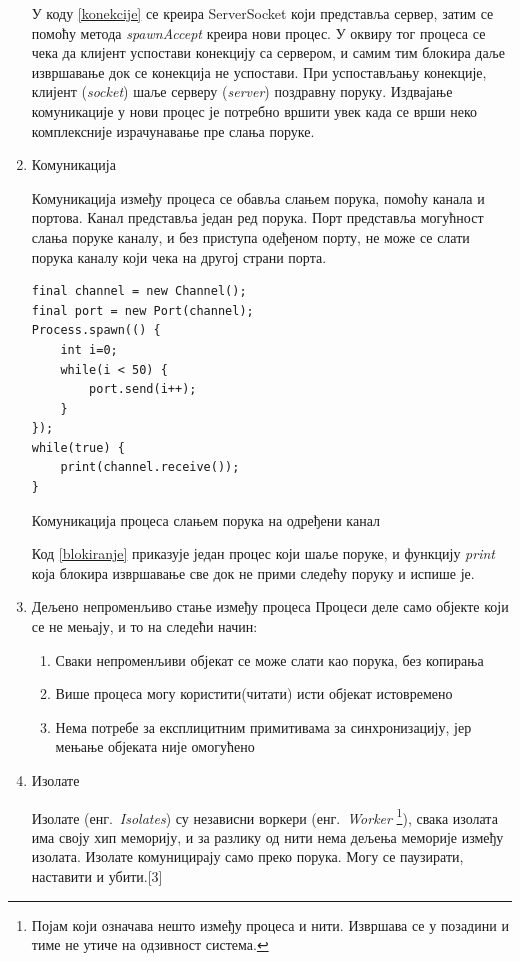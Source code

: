 \documentclass[12pt,oneside]{memoir}
\begin{document}
\begin{enumerate}
У коду \ref{konekcije} се креира ServerSocket који представља сервер, затим се помоћу метода \textit{spawnAccept} креира нови процес. У оквиру тог процеса се чека да клијент успостави конекцију са сервером, и самим тим блокира даље извршавање док се конекција не успостави. При успостављању конекције, клијент (\textit{socket}) шаље серверу (\textit{server}) поздравну поруку. Издвајање комуникације у нови процес је потребно вршити увек када се врши неко комплексније израчунавање пре слања поруке.

\item Комуникација

Комуникација између процеса се обавља слањем порука, помоћу канала и портова. Канал представља један ред порука. Порт представља могућност слања поруке каналу, и без приступа одеђеном порту, не може се слати порука каналу који чека на другој страни порта.\cite{Dartino}

\begin{listing}
\begin{verbatim}
final channel = new Channel();
final port = new Port(channel);
Process.spawn(() {
	int i=0;
	while(i < 50) {
		port.send(i++);
	}
});
while(true) {
	print(channel.receive());
}
\end{verbatim}
\caption{Комуникација процеса слањем порука на одређени канал}
\label{blokiranje}
\end{listing}
Код \ref{blokiranje} приказује један процес који шаље поруке, и функцију \textit{print} која блокира извршавање све док не прими следећу поруку и испише је.

\item Дељено непроменљиво стање између процеса
Процеси деле само објекте који се не мењају, и то на следећи начин:\cite{Dartino}
\begin{enumerate}
\item Сваки непроменљиви објекат се може слати као порука, без копирања
\item Више процеса могу користити(читати) исти објекат истовремено
\item Нема потребе за експлицитним примитивама за синхронизацију, јер мењање објеката није омогућено
\end{enumerate}

\item Изолате

Изолате (енг.~\textit{Isolates}) су независни воркери (енг.~\textit{Worker} \footnote{Појам који означава нешто између процеса и нити. Извршава се у позадини и тиме не утиче на одзивност система. }), свака изолата има своју хип меморију, и за разлику од нити нема дељења меморије између изолата. Изолате комуницирају само преко порука. Могу се паузирати, наставити и убити.[3]%


\end{enumerate}
\end{document}
